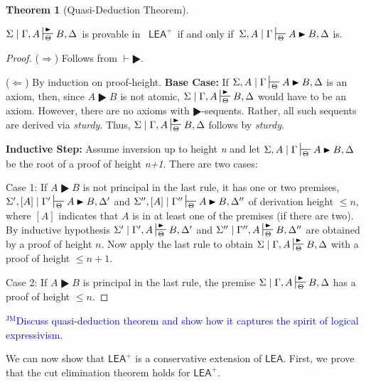\documentclass{article}
\theoremstyle{definition}
\newtheorem{theorem}{Theorem}
\theoremstyle{definition}
\theoremstyle{definition}
\theoremstyle{definition}
\theoremstyle{remark}
\theoremstyle{definition}
\theoremstyle{definition}
\newcommand{\jm}[1]{\textcolor{blue}{$^{\textrm{JM}}${#1}}}
\begin{document}
\begin{theorem}[Quasi-Deduction Theorem]\label{quasideduct}
	
	$\Sigma\mid\Gamma, A\sststile{\Theta}{\RHD}B,\Delta $\, is provable in \, $ \mathsf{LEA^+}$\, if and only if \,$  \Sigma, A\mid\Gamma\sststile{\Theta}{} A \RHD B, \Delta  $ is.
	
	\begin{proof}
		($ \Rightarrow$) Follows from $ \vdash\RHD $.
		
		($ \Leftarrow $) By induction on proof-height. 
		\textbf{Base Case:} If $ \Sigma, A\mid\Gamma\sststile{\Theta}{} A \RHD B, \Delta  $ is an axiom, then, since $ A \RHD B $ is not atomic, $\Sigma\mid\Gamma, A\sststile{\Theta}{\RHD}B,\Delta $ would have to be an axiom. However, there are no axioms with $ \RHD $-sequents. Rather, all such sequents are derived via \textit{sturdy}. Thus, $\Sigma\mid\Gamma, A\sststile{\Theta}{\RHD}B,\Delta $ follows by \textit{sturdy}. 
		
		\textbf{Inductive Step:} Assume inversion up to height \textit{n} and let $ \Sigma, A\mid\Gamma\sststile{\Theta}{} A \RHD B, \Delta  $ be the root of a proof of height \textit{n+1}. There are two cases:
		
		Case 1: If $  A \RHD B $ is not principal in the last rule, it has one or two premises, $ \Sigma', [A]\mid\Gamma'\sststile{\Theta}{} A \RHD B, \Delta'  $ and $ \Sigma'', [A]\mid\Gamma''\sststile{\Theta}{} A \RHD B, \Delta''  $ of derivation height $ \leq n $, where $ [A] $ indicates that $ A $ is in at least one of the premises (if there are two). By inductive hypothesis $\Sigma'\mid\Gamma', A\sststile{\Theta}{\RHD}B,\Delta' $ and $\Sigma''\mid\Gamma'', A\sststile{\Theta}{\RHD}B,\Delta'' $ are obtained by a proof of height $ n $. Now apply the last rule to obtain $\Sigma\mid\Gamma, A\sststile{\Theta}{\RHD}B,\Delta $ with a proof of height $ \leq n+1 $.
		
		Case 2: If $  A \RHD B$ is principal in the last rule, the premise $\Sigma\mid\Gamma, A\sststile{\Theta}{\RHD}B,\Delta $ has a proof of height $ \leq n $.
	\end{proof}
	
	
\end{theorem}





\jm{Discuss quasi-deduction theorem and show how it captures the spirit of logical expressivism.}


We can now show that $ \mathsf{LEA^+}$ is a conservative extension of $ \mathsf{LEA}$. First, we prove that the cut elimination theorem holds for $ \mathsf{LEA}^+ $.
\end{document}
